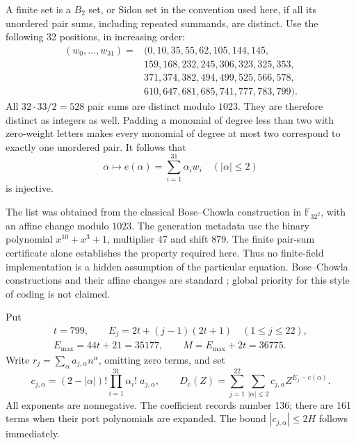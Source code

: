 \documentclass[11pt]{article}
\newcommand{\Dcode}{D_{\mathrm c}}
\theoremstyle{definition}
\theoremstyle{remark}
\numberwithin{equation}{section}
\begin{document}
A finite set is a \(B_2\) set, or Sidon set in the convention used here, if
all its unordered pair sums, including repeated summands, are distinct.
Use the following 32 positions, in increasing order:
\begin{equation}\label{eq:weights}
\begin{split}
(w_0,\ldots,w_{31})={}&(0,10,35,55,62,105,144,145,\\
 &159,168,232,245,306,323,325,353,\\
 &371,374,382,494,499,525,566,578,\\
 &610,647,681,685,741,777,783,799).
\end{split}
\end{equation}
All \(32\cdot33/2=528\) pair sums are distinct modulo \(1023\).
They are therefore distinct as integers as well. Padding a monomial of
degree less than two with zero-weight letters makes every monomial of
degree at most two correspond to exactly one unordered pair.
It follows that
\[
 \alpha\longmapsto e(\alpha)=\sum_{i=1}^{31}\alpha_iw_i
 \quad (|\alpha|\le2)
\]
is injective.

The list was obtained from the classical Bose--Chowla construction in
\(\mathbb F_{32^2}\), with an affine change modulo \(1023\).
The generation metadata use the binary polynomial \(x^{10}+x^3+1\),
multiplier 47 and shift 879. The finite pair-sum certificate alone
establishes the property required here. Thus no finite-field
implementation is a hidden assumption of the particular equation.
Bose--Chowla constructions and their affine changes are standard
\cite{bosechowla,obryant}; global priority for this style of coding is not
claimed.

Put
\begin{equation}\label{eq:targets}
\begin{gathered}
t=799,\qquad E_j=2t+(j-1)(2t+1)\quad(1\le j\le22),\\
E_{\max}=44t+21=35177,\qquad
M=E_{\max}+2t=36775.
\end{gathered}
\end{equation}
Write \(r_j=\sum_\alpha a_{j,\alpha}n^\alpha\), omitting zero terms, and
set
\begin{equation}\label{eq:weighted}
 c_{j,\alpha}=(2-|\alpha|)!\prod_{i=1}^{31}\alpha_i!\;a_{j,\alpha},
 \qquad
 \Dcode(Z)=\sum_{j=1}^{22}\sum_{|\alpha|\le2}
        c_{j,\alpha}Z^{E_j-e(\alpha)}.
\end{equation}
All exponents are nonnegative. The coefficient records number 136;
there are 161 terms when their port polynomials are expanded.
The bound \(|c_{j,\alpha}|\le2H\) follows immediately.
\end{document}
